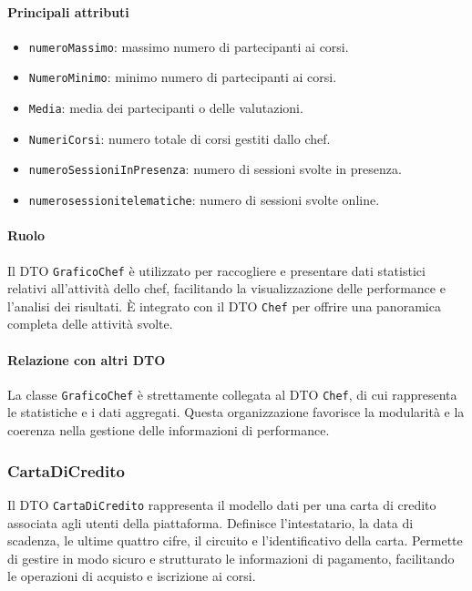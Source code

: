 \paragraph{Principali attributi}
\begin{itemize}
    \item \texttt{numeroMassimo}: massimo numero di partecipanti ai corsi.
    \item \texttt{NumeroMinimo}: minimo numero di partecipanti ai corsi.
    \item \texttt{Media}: media dei partecipanti o delle valutazioni.
    \item \texttt{NumeriCorsi}: numero totale di corsi gestiti dallo chef.
    \item \texttt{numeroSessioniInPresenza}: numero di sessioni svolte in presenza.
    \item \texttt{numerosessionitelematiche}: numero di sessioni svolte online.
\end{itemize}

\paragraph{Ruolo}
Il DTO \texttt{GraficoChef} è utilizzato per raccogliere e presentare dati statistici relativi all'attività dello chef, facilitando la visualizzazione delle performance e l'analisi dei risultati. È integrato con il DTO \texttt{Chef} per offrire una panoramica completa delle attività svolte.

\paragraph{Relazione con altri DTO}
La classe \texttt{GraficoChef} è strettamente collegata al DTO \texttt{Chef}, di cui rappresenta le statistiche e i dati aggregati. Questa organizzazione favorisce la modularità e la coerenza nella gestione delle informazioni di performance.

\subsubsection{CartaDiCredito}
Il DTO \texttt{CartaDiCredito} rappresenta il modello dati per una carta di credito associata agli utenti della piattaforma. Definisce l'intestatario, la data di scadenza, le ultime quattro cifre, il circuito e l'identificativo della carta. Permette di gestire in modo sicuro e strutturato le informazioni di pagamento, facilitando le operazioni di acquisto e iscrizione ai corsi.

